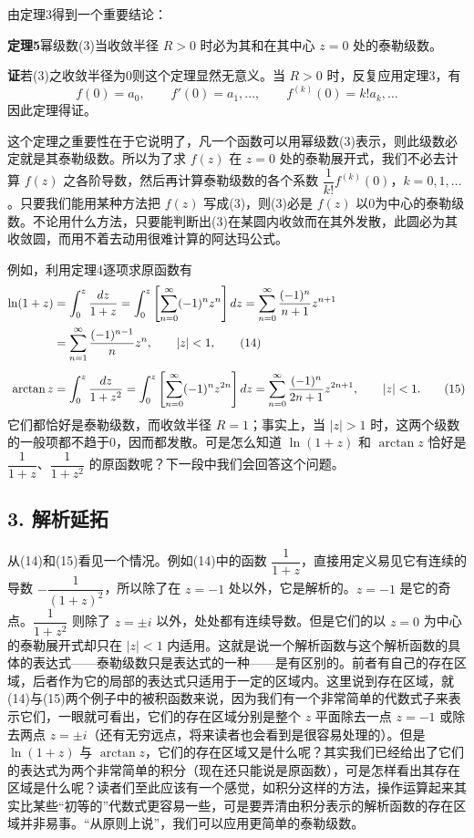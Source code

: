 由定理3得到一个重要结论：

\noindent\textbf{定理5}\quad 幂级数(3)当收敛半径 $R>0$ 时必为其和在其中心 $z=0$ 处的泰勒级数。

\noindent\textbf{证}\quad 若(3)之收敛半径为0则这个定理显然无意义。当 $R>0$ 时，反复应用定理3，有
\[
 f(0)=a_0,\qquad f'(0)=a_1,\ldots,\qquad f^{(k)}(0)=k!a_k,\ldots
\]
因此定理得证。

这个定理之重要性在于它说明了，凡一个函数可以用幂级数(3)表示，则此级数必定就是其泰勒级数。所以为了求 $f(z)$ 在 $z=0$ 处的泰勒展开式，我们不必去计算 $f(z)$ 之各阶导数，然后再计算泰勒级数的各个系数 $\dfrac1{k!}f^{(k)}(0)$，$k=0,1,\ldots$。只要我们能用某种方法把 $f(z)$ 写成(3)，则(3)必是 $f(z)$ 以0为中心的泰勒级数。不论用什么方法，只要能判断出(3)在某圆内收敛而在其外发散，此圆必为其收敛圆，而用不着去动用很难计算的阿达玛公式。

例如，利用定理4逐项求原函数有
\begin{align}
 \ln(1+z)
 &=\int_0^z\frac{dz}{1+z}
 =\int_0^z\left[\sum_{n=0}^{\infty}(-1)^nz^n\right]dz
 =\sum_{n=0}^{\infty}\frac{(-1)^n}{n+1}z^{n+1}\notag\\
 &=\sum_{n=1}^{\infty}\frac{(-1)^{n-1}}n z^n,
 \qquad |z|<1,
 \tag{14}\\[1ex]
 \arctan z
 &=\int_0^z\frac{dz}{1+z^2}
 =\int_0^z\left[\sum_{n=0}^{\infty}(-1)^nz^{2n}\right]dz
 =\sum_{n=0}^{\infty}\frac{(-1)^n}{2n+1}z^{2n+1},\qquad |z|<1.
 \tag{15}
\end{align}
它们都恰好是泰勒级数，而收敛半径 $R=1$；事实上，当 $|z|>1$ 时，这两个级数的一般项都不趋于0，因而都发散。可是怎么知道 $\ln(1+z)$ 和 $\arctan z$ 恰好是 $\dfrac1{1+z}$、$\dfrac1{1+z^2}$ 的原函数呢？下一段中我们会回答这个问题。

\subsection*{3. 解析延拓}

从(14)和(15)看见一个情况。例如(14)中的函数 $\dfrac1{1+z}$，直接用定义易见它有连续的导数 $-\dfrac1{(1+z)^2}$，所以除了在 $z=-1$ 处以外，它是解析的。$z=-1$ 是它的奇点。$\dfrac1{1+z^2}$ 则除了 $z=\pm i$ 以外，处处都有连续导数。但是它们的以 $z=0$ 为中心的泰勒展开式却只在 $|z|<1$ 内适用。这就是说一个解析函数与这个解析函数的具体的表达式——泰勒级数只是表达式的一种——是有区别的。前者有自己的存在区域，后者作为它的局部的表达式只适用于一定的区域内。这里说到存在区域，就(14)与(15)两个例子中的被积函数来说，因为我们有一个非常简单的代数式子来表示它们，一眼就可看出，它们的存在区域分别是整个 $z$ 平面除去一点 $z=-1$ 或除去两点 $z=\pm i$（还有无穷远点，将来读者也会看到是很容易处理的）。但是 $\ln(1+z)$ 与 $\arctan z$，它们的存在区域又是什么呢？其实我们已经给出了它们的表达式为两个非常简单的积分（现在还只能说是原函数），可是怎样看出其存在区域是什么呢？读者们至此应该有一个感觉，如积分这样的方法，操作运算起来其实比某些“初等的”代数式更容易一些，可是要弄清由积分表示的解析函数的存在区域并非易事。“从原则上说”，我们可以应用更简单的泰勒级数。

